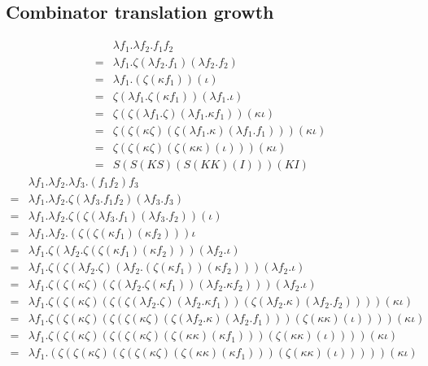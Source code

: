 \documentclass[11pt,oneside,a4paper]{report}
\begin{document}
\subsection{Combinator translation growth}
\begin{align}
    &\lambda f_1 . \lambda f_2 . f_1 f_2\\
    =&\lambda f_1 . \zeta(\lambda f_2 . f_1)(\lambda f_2 . f_2) \tag*{} \\
    =&\lambda f_1 . (\zeta(\kappa f_1))(\iota) \tag*{} \\
    =&\zeta (\lambda f_1 . \zeta (\kappa f_1)) (\lambda f_1 . \iota) \tag*{} \\
    =&\zeta (\zeta (\lambda f_1 . \zeta) (\lambda f_1 . \kappa f_1)) (\kappa \iota) \tag*{} \\
    =&\zeta (\zeta (\kappa \zeta) (\zeta (\lambda f_1 . \kappa) (\lambda f_1 . f_1))) (\kappa \iota) \tag*{} \\
    =&\zeta (\zeta (\kappa \zeta) (\zeta (\kappa \kappa) (\iota))) (\kappa \iota) \tag*{} \\
    =&S (S (K S) (S (K K) (I))) (K I) \tag*{}
\end{align}
\begin{align}
    &\lambda f_1 . \lambda f_2 . \lambda f_3 . (f_1 f_2) f_3\\
    =&\lambda f_1 . \lambda f_2 . \zeta (\lambda f_3 . f_1 f_2) (\lambda f_3 . f_3)\\
    =&\lambda f_1 . \lambda f_2 . \zeta (\zeta (\lambda f_3 . f_1) (\lambda f_3 . f_2)) (\iota)\\
    =&\lambda f_1 . \lambda f_2 . (\zeta (\zeta (\kappa f_1) (\kappa f_2))) \iota\\
    =&\lambda f_1 . \zeta (\lambda f_2 . \zeta (\zeta (\kappa f_1) (\kappa f_2))) (\lambda f_2 . \iota)\\
    =&\lambda f_1 . \zeta (\zeta (\lambda f_2 . \zeta) (\lambda f_2 . (\zeta (\kappa f_1)) (\kappa f_2))) (\lambda f_2 . \iota)\\
    =&\lambda f_1 . \zeta (\zeta (\kappa \zeta) (\zeta (\lambda f_2 . \zeta (\kappa f_1)) (\lambda f_2 . \kappa f_2))) (\lambda f_2 . \iota)\\
    =&\lambda f_1 . \zeta (\zeta (\kappa \zeta) (\zeta (\zeta (\lambda f_2 . \zeta) (\lambda f_2 . \kappa f_1)) (\zeta (\lambda f_2 . \kappa) (\lambda f_2 . f_2 )))) (\kappa \iota)\\
    =&\lambda f_1 . \zeta (\zeta (\kappa \zeta) (\zeta (\zeta (\kappa \zeta) (\zeta (\lambda f_2 . \kappa) (\lambda f_2 . f_1))) (\zeta (\kappa \kappa) (\iota)))) (\kappa \iota)\\
    =&\lambda f_1 . \zeta (\zeta (\kappa \zeta) (\zeta (\zeta (\kappa \zeta) (\zeta (\kappa \kappa) (\kappa f_1))) (\zeta (\kappa \kappa) (\iota)))) (\kappa \iota)\\
    =&\lambda f_1 . (\zeta (\zeta (\kappa \zeta) (\zeta (\zeta (\kappa \zeta) (\zeta (\kappa \kappa) (\kappa f_1))) (\zeta (\kappa \kappa) (\iota))))) (\kappa \iota)\\
\end{align}
\end{document}
